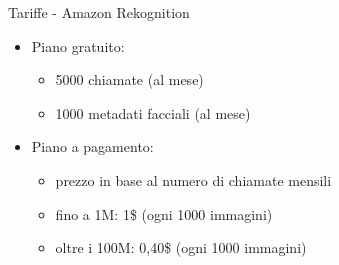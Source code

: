 %
\begin{frame}[t]{Tariffe - Amazon Rekognition}
\begin{itemize}
	\item Piano gratuito:
	\begin{itemize}
		\item 5000 chiamate (al mese)
		\item 1000 metadati facciali (al mese)
	\end{itemize}
	\item Piano a pagamento:
	\begin{itemize}
		\item prezzo in base al numero di chiamate mensili
		\item fino a 1M: 1\$ (ogni 1000 immagini)
		\item oltre i 100M: 0,40\$ (ogni 1000 immagini)
	\end{itemize}
\end{itemize}
\end{frame}
%
